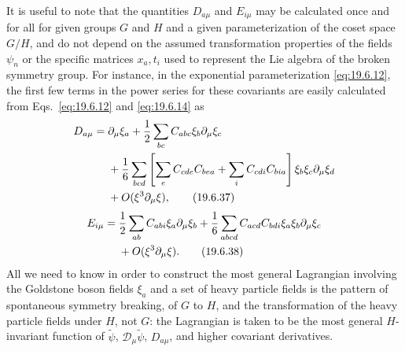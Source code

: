 It is useful to note that the quantities $D_{a\mu}$ and $E_{i\mu}$ may be calculated once and for all for given groups $G$ and $H$ and a given parameterization of the coset space $G/H$, and do not depend on the assumed transformation properties of the fields $\psi_n$ or the specific matrices $x_a,t_i$ used to represent the Lie algebra of the broken symmetry group. For instance, in the exponential parameterization \eqref{eq:19.6.12}, the first few terms in the power series for these covariants are easily calculated from Eqs.~\eqref{eq:19.6.12} and \eqref{eq:19.6.14} as
\begin{align}
D_{a\mu}
={}&\partial_\mu\xi_a
+\frac{1}{2}\sum_{bc}C_{abc}\xi_b\partial_\mu\xi_c
\notag\\
&+\frac{1}{6}\sum_{bcd}
\left[
\sum_eC_{cde}C_{bea}
+\sum_iC_{cdi}C_{bia}
\right]\xi_b\xi_c\partial_\mu\xi_d
\notag\\
&+O(\xi^3\partial_\mu\xi),
\tag{19.6.37}\label{eq:19.6.37}
\end{align}
\begin{align}
E_{i\mu}
={}&\frac{1}{2}\sum_{ab}C_{abi}\xi_a\partial_\mu\xi_b
+\frac{1}{6}\sum_{abcd}C_{acd}C_{bdi}
\xi_a\xi_b\partial_\mu\xi_c
\notag\\
&+O(\xi^3\partial_\mu\xi).
\tag{19.6.38}\label{eq:19.6.38}
\end{align}
All we need to know in order to construct the most general Lagrangian involving the Goldstone boson fields $\xi_a$ and a set of heavy particle fields is the pattern of spontaneous symmetry breaking, of $G$ to $H$, and the transformation of the heavy particle fields under $H$, not $G$: the Lagrangian is taken to be the most general $H$-invariant function of $\widetilde\psi$, $\mathcal D_\mu\widetilde\psi$, $D_{a\mu}$, and higher covariant derivatives.

